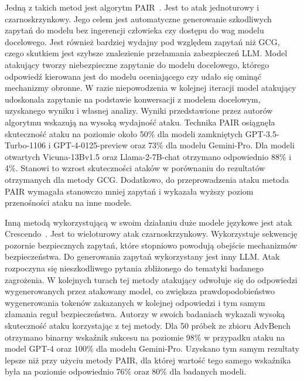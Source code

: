 Jedną z takich metod jest algorytm \gls{PAIR}~\cite{chao2024jailbreakingblackboxlarge}. Jest to atak jednoturowy i czarnoskrzynkowy. Jego celem jest automatyczne generowanie szkodliwych zapytań do modelu bez ingerencji człowieka czy dostępu do wag modelu docelowego. Jest również bardziej wydajny pod względem zapytań niż GCG, czego skutkiem jest szybsze znalezienie przełamania zabezpieczeń LLM.
Model atakujący tworzy niebezpieczne zapytanie do modelu docelowego, którego odpowiedź kierowana jest do modelu oceniającego czy udało się ominąć mechanizmy obronne. W razie niepowodzenia w kolejnej iteracji model atakujący udoskonala zapytanie na podstawie konwersacji z modelem docelowym, uzyskanego wyniku i własnej analizy.
Wyniki przedstawione przez autorów algorytmu wskazują na wysoką wydajność ataku. Technika PAIR osiągnęła skuteczność ataku na poziomie około 50\% dla modeli zamkniętych GPT-3.5-Turbo-1106 i GPT-4-0125-preview oraz 73\% dla modelu Gemini-Pro. Dla modeli otwartych Vicuna-13Bv1.5 oraz Llama-2-7B-chat otrzymano odpowiednio 88\% i 4\%. Stanowi to wzrost skuteczności ataków w porównaniu do rezultatów otrzymanych dla metody GCG.
Dodatkowo, do przeprowadzenia ataku metoda PAIR wymagała stanowczo mniej zapytań i wykazała wyższy poziom przenośności ataku na inne modele.

Inną metodą wykorzystującą w swoim działaniu duże modele językowe jest atak Crescendo~\cite{russinovich2025greatwritearticlethat}. Jest to wieloturowy atak czarnoskrzynkowy. Wykorzystuje sekwencję pozornie bezpiecznych zapytań, które stopniowo powodują obejście mechanizmów bezpieczeństwa. Do generowania zapytań wykorzystany jest inny LLM.
Atak rozpoczyna się nieszkodliwego pytania zbliżonego do tematyki badanego zagrożenia. W kolejnych turach tej metody atakujący odwołuje się do odpowiedzi wygenerowanych przez atakowany model, co zwiększa prawdopodobieństwo wygenerowania tokenów zakazanych w kolejnej odpowiedzi i tym samym złamania reguł bezpieczeństwa. Autorzy w swoich badaniach wykazali wysoką skuteczność ataku korzystając z tej metody. Dla 50 próbek ze zbioru AdvBench otrzymano binarny wskaźnik sukcesu na poziomie 98\% w przypadku ataku na model GPT-4 oraz 100\% dla modelu Gemini-Pro. Uzyskano tym samym rezultaty lepsze niż przy użyciu metody PAIR, dla której wartość tego samego wskaźnika była na poziomie odpowiednio 76\% oraz 80\% dla badanych modeli.